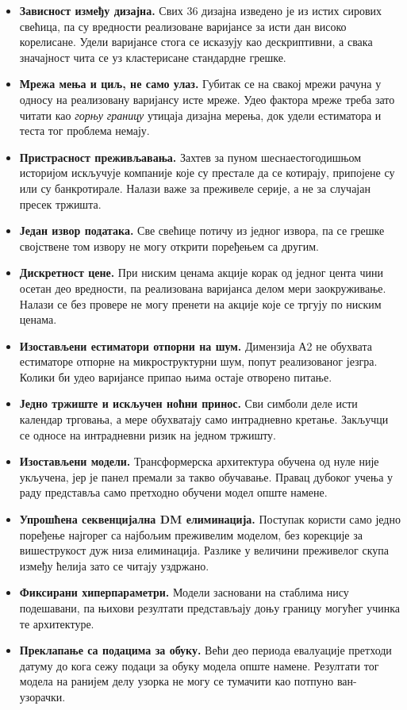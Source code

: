 \begin{itemize}
\item \textbf{Зависност између дизајна.} Свих 36 дизајна изведено је из истих
      сирових свећица, па су вредности реализоване варијансе за исти дан високо
      корелисане. Удели варијансе стога се исказују као дескриптивни, а свака значајност
      чита се уз кластерисане стандардне грешке.
\item \textbf{Мрежа мења и циљ, не само улаз.} Губитак се на свакој мрежи рачуна у односу
      на реализовану варијансу исте мреже. Удео фактора мреже треба зато читати као
      \emph{горњу границу} утицаја дизајна мерења, док удели естиматора и теста тог
      проблема немају.
\item \textbf{Пристрасност преживљавања.} Захтев за пуном шеснаестогодишњом историјом
      искључује компаније које су престале да се котирају, припојене су или су
      банкротирале. Налази важе за преживеле серије, а не за случајан пресек тржишта.
\item \textbf{Један извор података.} Све свећице потичу из једног извора, па се грешке
      својствене том извору не могу открити поређењем са другим.
\item \textbf{Дискретност цене.} При ниским ценама акције корак од једног цента чини
      осетан део вредности, па реализована варијанса делом мери заокруживање. Налази се
      без провере не могу пренети на акције које се тргују по ниским ценама.
\item \textbf{Изостављени естиматори отпорни на шум.} Димензија А2 не обухвата естиматоре
      отпорне на микроструктурни шум, попут реализованог језгра. Колики би удео варијансе
      припао њима остаје отворено питање.
\item \textbf{Једно тржиште и искључен ноћни принос.} Сви симболи деле исти календар
      трговања, а мере обухватају само интрадневно кретање. Закључци се односе на
      интрадневни ризик на једном тржишту.
\item \textbf{Изостављени модели.} Трансформерска архитектура обучена од нуле није
      укључена, јер је панел премали за такво обучавање. Правац дубоког учења у раду
      представља само претходно обучени модел опште намене.
\item \textbf{Упрошћена секвенцијална DM елиминација.} Поступак користи само једно
      поређење најгорег са најбољим преживелим моделом, без корекције за вишеструкост
      дуж низа елиминација. Разлике у величини преживелог скупа између ћелија зато се
      читају уздржано.
\item \textbf{Фиксирани хиперпараметри.} Модели засновани на стаблима нису подешавани, па
      њихови резултати представљају доњу границу могућег учинка те архитектуре.
\item \textbf{Преклапање са подацима за обуку.} Већи део периода евалуације претходи
      датуму до кога сежу подаци за обуку модела опште намене. Резултати тог модела
      на ранијем делу узорка не могу се тумачити као потпуно ван-узорачки.
\end{itemize}
